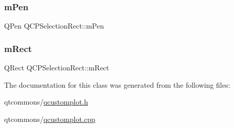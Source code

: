\subsubsection{\texorpdfstring{mPen}{mPen}}
{\footnotesize\ttfamily Q\+Pen Q\+C\+P\+Selection\+Rect\+::m\+Pen\hspace{0.3cm}{\ttfamily [protected]}}

\mbox{\label{class_q_c_p_selection_rect_a45a2600ef19c8f7b5ec6134beab036cf}} 
\subsubsection{\texorpdfstring{mRect}{mRect}}
{\footnotesize\ttfamily Q\+Rect Q\+C\+P\+Selection\+Rect\+::m\+Rect\hspace{0.3cm}{\ttfamily [protected]}}



The documentation for this class was generated from the following files\+:\begin{DoxyCompactItemize}
\item 
qtcommons/\mbox{\hyperlink{qcustomplot_8h}{qcustomplot.\+h}}\item 
qtcommons/\mbox{\hyperlink{qcustomplot_8cpp}{qcustomplot.\+cpp}}\end{DoxyCompactItemize}
